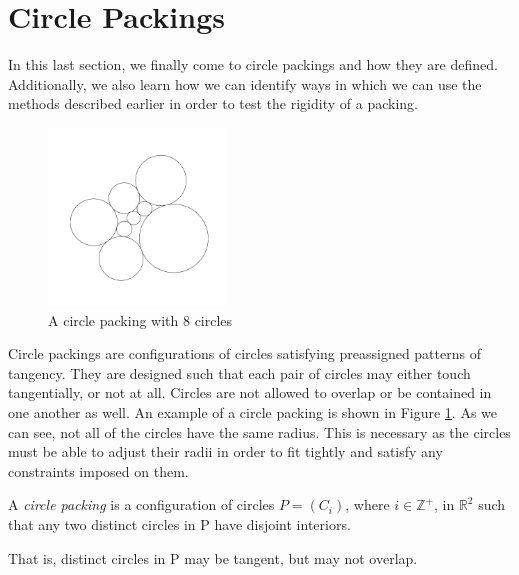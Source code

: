 
\section{Circle Packings}

\begin{flushleft}
 In this last section, we finally come to circle packings and how they are defined. Additionally, we also learn how we can identify ways in which we can use the methods described earlier in order to test the rigidity of a packing. 
\end{flushleft}

\begin{figure}[htbp]
    \centering
    \includegraphics[width = 0.42\textwidth]{Chapter 3/7. Plain packing.png}
    \caption{A circle packing with 8 circles}
    \label{fig: circle packing example}
\end{figure}
\vspace{-4 mm}
\begin{flushleft}
Circle packings are configurations of circles satisfying preassigned patterns of tangency. They are designed such that each pair of circles may either touch tangentially, or not at all. Circles are not allowed to overlap or be contained in one another as well. An example of a circle packing is shown in Figure \ref{fig: circle packing example}. As we can see, not all of the circles have the same radius. This is necessary as the circles must be able to adjust their radii in order to fit tightly and satisfy any constraints imposed on them.
\end{flushleft}

\begin{definition}
\label{def: circle packing}
A \textit{circle packing} is a configuration of circles $P = (C_i)$, where $i \in \mathbb{Z}^+$, in $\mathbb{R}^2$ such that any
two distinct circles in P have disjoint interiors. 

\noindent
That is, distinct circles in P may be tangent, but may not overlap.
\end{definition}

